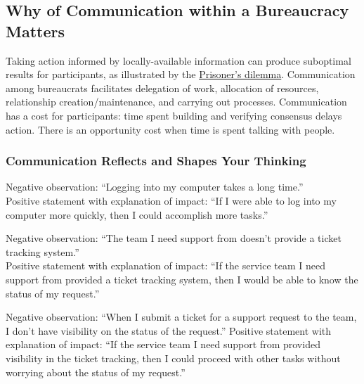 \subsection{Why of Communication within a Bureaucracy Matters}

Taking action informed by locally-available information can produce suboptimal results for participants, as illustrated by the \href{https://en.wikipedia.org/wiki/Prisoner\%27s\_dilemma}{Prisoner's dilemma}. Communication among bureaucrats facilitates delegation of work, allocation of resources, relationship creation/maintenance, and carrying out processes. Communication has a cost for participants: time spent building and verifying consensus delays action. There is an opportunity cost when time is spent talking with people.




\subsubsection{Communication Reflects and Shapes Your Thinking}

Negative observation: ``Logging into my computer takes a long time.''\\
Positive statement with explanation of impact: ``If I were able to log into my computer more quickly, then I could accomplish more tasks.''

Negative observation: ``The team I need support from doesn't provide a ticket tracking system.''\\
Positive statement with explanation of impact: ``If the service team I need support from provided a ticket tracking system, then I would be able to know the status of my request.''

Negative observation: ``When I submit a ticket for a support request to the team, I don't have visibility on the status of the request.''
Positive statement with explanation of impact: ``If the service team I need support from provided visibility in the ticket tracking, then I could proceed with other tasks without worrying about the status of my request.''
